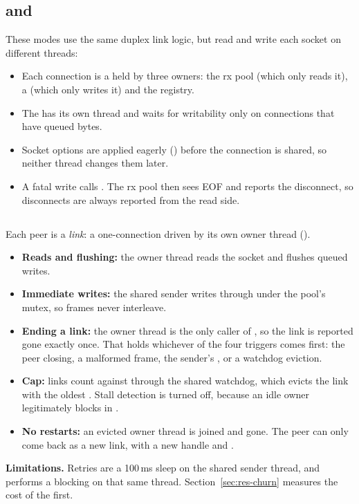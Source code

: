\subsection{ and }

These modes use the same duplex link logic, but read and write each socket on
different threads:
\begin{itemize}
  \item Each connection is a  held by three owners:
        the rx pool (which only reads it), a  (which only writes it)
        and the registry.
  \item The  has its own thread and waits for writability only on
        connections that have queued bytes.
  \item Socket options are applied eagerly () before the
        connection is shared, so neither thread changes them later.
  \item A fatal write calls . The rx pool then sees EOF and
        reports the disconnect, so disconnects are always reported from the read
        side.
\end{itemize}

\subsection{}

Each peer is a \emph{link}: a one-connection  driven by its
own owner thread ().
\begin{itemize}
  \item \textbf{Reads and flushing:} the owner thread reads the socket and flushes
        queued writes.
  \item \textbf{Immediate writes:} the shared sender writes through
         under the pool's mutex, so frames never interleave.
  \item \textbf{Ending a link:} the owner thread is the only caller of
        , so the link is reported gone exactly once. That holds
        whichever of the four triggers comes first: the peer closing, a malformed
        frame, the sender's , or a watchdog eviction.
  \item \textbf{Cap:} links count against  through the shared
        watchdog, which evicts the link with the oldest . Stall
        detection is turned off, because an idle owner legitimately blocks in
        .
  \item \textbf{No restarts:} an evicted owner thread is joined and gone. The peer
        can only come back as a new link, with a new handle and .
\end{itemize}

\textbf{Limitations.} Retries are a 100\,ms sleep on the shared sender thread, and
 performs a blocking  on that same thread.
Section~\ref{sec:res-churn} measures the cost of the first.
